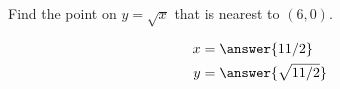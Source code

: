 \documentclass{ximera}
\author{Bart Snapp}
\begin{document}
\begin{exercise}

  Find the point on $y=\sqrt{x}$ that is nearest to $(6,0)$.
  \begin{prompt}
  \begin{align*}
  x &= \answer{11/2}\\
  y &= \answer{\sqrt{11/2}}
  \end{align*}
  \end{prompt}
\end{exercise}
\end{document}
